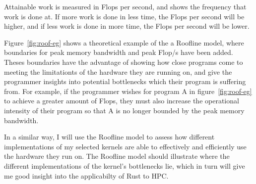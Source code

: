 Attainable work is measured in Flops per second, and shows the frequency that work is done at. If more work is done in less time, the Flops per second will be higher, and if less work is done in more time, the Flops per second will be lower.

Figure~\ref{fig:roof-eg} shows a theoretical example of the a Roofline model, where boundaries for peak memory bandwidth and peak Flop/s have been added. Theses boundaries have the advantage of showing how close programs come to meeting the limitationts of the hardware they are running on, and give the programmer insights into potential bottlenecks which their program is suffering from. 
For example, if the programmer wishes for program A in figure~\ref{fig:roof-eg} to achieve a greater amount of Flops, they must also increase the operational intensity of their program so that A is no longer bounded by the peak memory bandwidth.

In a similar way, I will use the Roofline model to assess how different implementations of my selected kernels are able to effectively and efficiently use the hardware they run on. The Roofline model should illustrate where the different implementations of the kernel's bottlenecks lie, which in turn will give me good insight into the applicabilty of Rust to HPC.
